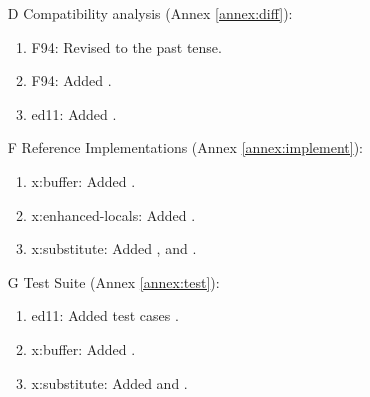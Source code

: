 \begin{itemize}
	\item[D] Compatibility analysis 				(Annex \ref{annex:diff}):
		\begin{enumerate}
		\item \textsf{F94}: Revised  to the past tense.
		\item \textsf{F94}: Added .
		\item \textsf{ed11}: Added .
		\end{enumerate}

	\item[F] Reference Implementations			(Annex \ref{annex:implement}):
		\begin{enumerate}
		\item \textsf{x:buffer}: Added .
		\item \textsf{x:enhanced-locals}: Added .
		\item \textsf{x:substitute}: Added
			,
			 and
			.
		\end{enumerate}

	\item[G] Test Suite								(Annex \ref{annex:test}):
		\begin{enumerate}
		\item \textsf{ed11}: Added test cases .
		\item \textsf{x:buffer}: Added .
		\item \textsf{x:substitute}: Added
			 and
			.
		\end{enumerate}
	\end{itemize}


